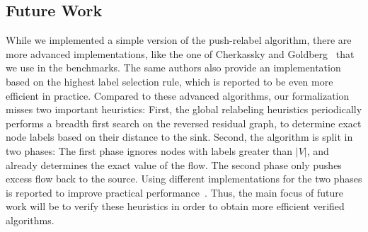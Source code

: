 \documentclass[smallcondensed]{svjour3}     %
\begin{document}
  \subsection{Future Work}
  While we implemented a simple version of the push-relabel algorithm, there are more advanced implementations, like the one of Cherkassky and Goldberg~\cite{ChGo97} that 
  we use in the benchmarks. The same authors also provide an implementation based on the highest label selection rule, which is reported to be even more efficient 
  in practice. 
  Compared to these advanced algorithms, our formalization misses two important heuristics: First, the global relabeling heuristics periodically performs a breadth first search on the reversed residual graph, to determine exact node labels based on their distance to the sink. Second, the algorithm is split in two phases: 
  The first phase ignores nodes with labels greater than $|V|$, and already determines the exact value of the flow. The second phase only pushes excess flow back to the source.
  Using different implementations for the two phases is reported to improve practical performance~\cite{ChGo97}. 
  Thus, the main focus of future work will be to verify these heuristics in order to obtain more efficient verified algorithms.
  
\end{document}
